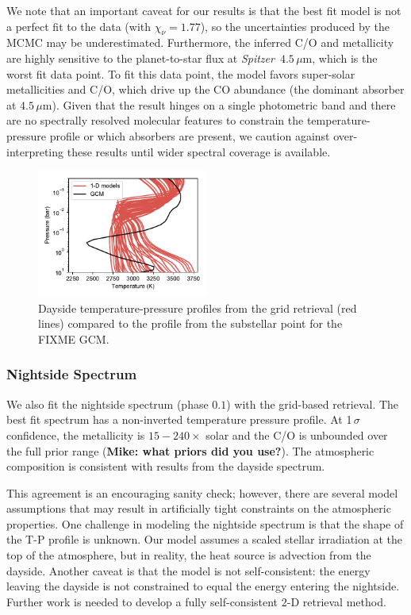 \documentclass[twocolumn]{aastex61}
\newcommand{\project}[1]{\textsl{#1}}
\newcommand{\Spitzer}{\project{Spitzer}}
\begin{document}
We note that an important caveat for our results is that the best fit model is not a perfect fit to the data (with $\chi_\nu = 1.77$), so the uncertainties produced by the MCMC may be underestimated. Furthermore, the inferred C/O and metallicity are highly sensitive to the planet-to-star flux at \Spitzer\ $4.5\,\mu$m, which is the worst fit data point. To fit this data point, the model favors super-solar metallicities and C/O, which drive up the CO abundance (the dominant absorber at $4.5\,\mu$m). Given that the result hinges on a single photometric band and there are no spectrally resolved molecular features to constrain the temperature-pressure profile or which absorbers are present, we caution against over-interpreting these results until wider spectral coverage is available.

\begin{figure}
\includegraphics[width = 0.5\textwidth]{Figures/TP.pdf}
\caption{Dayside temperature-pressure profiles from the grid retrieval (red lines) compared to the profile from the substellar point for the FIXME GCM.}
\label{fig:TP}
\end{figure}

\subsubsection{Nightside Spectrum}
We also fit the nightside spectrum (phase $0.1$) with the grid-based retrieval. The best fit spectrum has a non-inverted temperature pressure profile.  At 1\,$\sigma$ confidence, the metallicity is $15 - 240\times$ solar and the C/O is unbounded over the full prior range (\textbf{Mike: what priors did you use?}). The atmospheric composition is consistent with results from the dayside spectrum. 

This agreement is an encouraging sanity check; however, there are several model assumptions that may result in artificially tight constraints on the atmospheric properties.  One challenge in modeling the nightside spectrum is that the shape of the T-P profile is unknown.  Our model assumes a scaled stellar irradiation at the top of the atmosphere, but in reality, the heat source is advection from the dayside. Another caveat is that the model is not self-consistent: the energy leaving the dayside is not constrained to equal the energy entering the nightside.  Further work is needed to develop a fully self-consistent 2-D retrieval method. 
\end{document}
